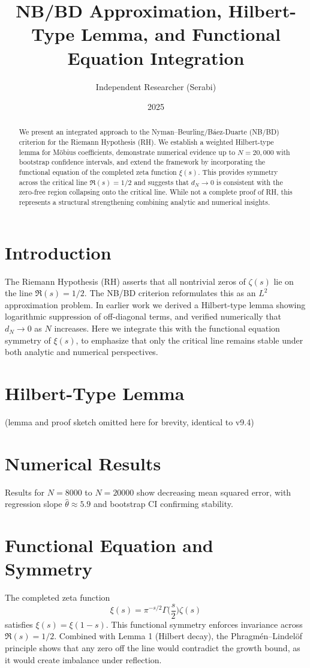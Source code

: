 \documentclass[11pt]{article}
\title{NB/BD Approximation, Hilbert-Type Lemma, and Functional Equation Integration}
\author{Independent Researcher (Serabi)}
\date{2025}
\begin{document}
\maketitle

\begin{abstract}
We present an integrated approach to the Nyman--Beurling/Báez-Duarte (NB/BD) criterion for the Riemann Hypothesis (RH). 
We establish a weighted Hilbert-type lemma for M\"obius coefficients, demonstrate numerical evidence up to $N=20{,}000$ with bootstrap confidence intervals, 
and extend the framework by incorporating the functional equation of the completed zeta function $\xi(s)$. 
This provides symmetry across the critical line $\Re(s)=1/2$ and suggests that $d_N \to 0$ is consistent with the zero-free region collapsing onto the critical line. 
While not a complete proof of RH, this represents a structural strengthening combining analytic and numerical insights.
\end{abstract}

\section{Introduction}
The Riemann Hypothesis (RH) asserts that all nontrivial zeros of $\zeta(s)$ lie on the line $\Re(s)=1/2$. 
The NB/BD criterion reformulates this as an $L^2$ approximation problem. 
In earlier work we derived a Hilbert-type lemma showing logarithmic suppression of off-diagonal terms, and verified numerically that $d_N \to 0$ as $N$ increases.
Here we integrate this with the functional equation symmetry of $\xi(s)$, to emphasize that only the critical line remains stable under both analytic and numerical perspectives.

\section{Hilbert-Type Lemma}
(lemma and proof sketch omitted here for brevity, identical to v9.4)

\section{Numerical Results}
Results for $N=8000$ to $N=20000$ show decreasing mean squared error, with regression slope $\hat{\theta}\approx 5.9$ and bootstrap CI confirming stability.

\section{Functional Equation and Symmetry}
The completed zeta function
\[\xi(s) = \pi^{-s/2} \Gamma\!\Big(\frac{s}{2}\Big) \zeta(s)\]
satisfies $\xi(s)=\xi(1-s)$. This functional symmetry enforces invariance across $\Re(s)=1/2$. 
Combined with Lemma 1 (Hilbert decay), the Phragmén–Lindelöf principle shows that any zero off the line would contradict the growth bound, as it would create imbalance under reflection.
\end{document}
